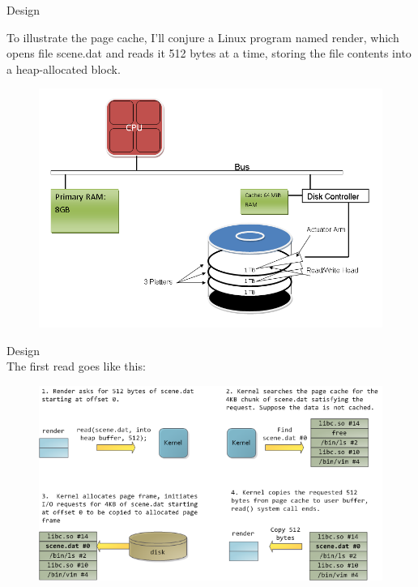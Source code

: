 \begin{frame}[plain,t]{Design} %
     \\
    \vspace{2ex}
   
    To illustrate the page cache, I'll conjure a Linux program named render, which opens file scene.dat and reads it 512 bytes at a time, storing the file contents into a heap-allocated block. 
    
   \begin{figure}
       \centering
       \includegraphics[width=0.7\linewidth]{image/0214}
       \label{fig:0214}
   \end{figure}

   
   
   
 
   
    
    
\end{frame}
\begin{frame}[plain,t]{Design} %
     \\
    \vspace{2ex}
    The first read goes like this:
    \begin{figure}
        \centering
        \includegraphics[width=0.9\linewidth]{image/0215}
        \label{fig:0215}
    \end{figure}
    
\end{frame}
